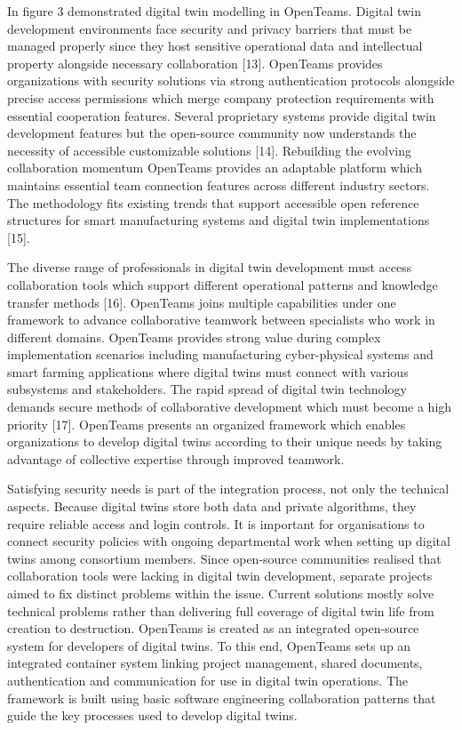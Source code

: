 
\begin{multicols}{2}
In figure 3 demonstrated digital twin modelling in OpenTeams. Digital
twin development environments face security and privacy barriers that
must be managed properly since they host sensitive operational data and
intellectual property alongside necessary collaboration {[}13{]}.
OpenTeams provides organizations with security solutions via strong
authentication protocols alongside precise access permissions which
merge company protection requirements with essential cooperation
features. Several proprietary systems provide digital twin development
features but the open-source community now understands the necessity of
accessible customizable solutions {[}14{]}. Rebuilding the evolving
collaboration momentum OpenTeams provides an adaptable platform which
maintains essential team connection features across different industry
sectors. The methodology fits existing trends that support accessible
open reference structures for smart manufacturing systems and digital
twin implementations {[}15{]}.

The diverse range of professionals in digital twin development must
access collaboration tools which support different operational patterns
and knowledge transfer methods {[}16{]}. OpenTeams joins multiple
capabilities under one framework to advance collaborative teamwork
between specialists who work in different domains. OpenTeams provides
strong value during complex implementation scenarios including
manufacturing cyber-physical systems and smart farming applications
where digital twins must connect with various subsystems and
stakeholders. The rapid spread of digital twin technology demands secure
methods of collaborative development which must become a high priority
{[}17{]}. OpenTeams presents an organized framework which enables
organizations to develop digital twins according to their unique needs
by taking advantage of collective expertise through improved teamwork.

Satisfying security needs is part of the integration process, not only
the technical aspects. Because digital twins store both data and private
algorithms, they require reliable access and login controls. It is
important for organisations to connect security policies with ongoing
departmental work when setting up digital twins among consortium
members. Since open-source communities realised that collaboration tools
were lacking in digital twin development, separate projects aimed to fix
distinct problems within the issue. Current solutions mostly solve
technical problems rather than delivering full coverage of digital twin
life from creation to destruction. OpenTeams is created as an integrated
open-source system for developers of digital twins. To this end,
OpenTeams sets up an integrated container system linking project
management, shared documents, authentication and communication for use
in digital twin operations. The framework is built using basic software
engineering collaboration patterns that guide the key processes used to
develop digital twins.


\end{multicols}
